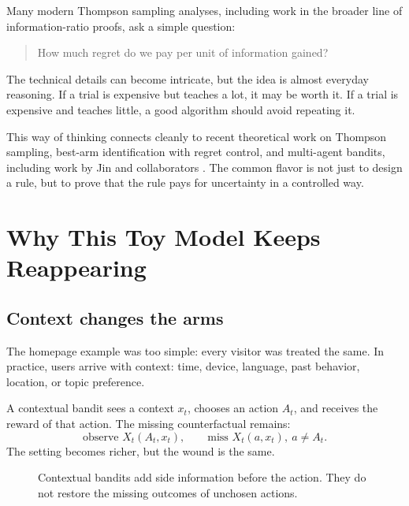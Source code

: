 \documentclass[en,nofont,11pt]{elegantbook}
\begin{document}
Many modern Thompson sampling analyses, including work in the broader line of information-ratio proofs, ask a simple question:

\begin{quote}
How much regret do we pay per unit of information gained?
\end{quote}

The technical details can become intricate, but the idea is almost everyday reasoning. If a trial is expensive but teaches a lot, it may be worth it. If a trial is expensive and teaches little, a good algorithm should avoid repeating it.

This way of thinking connects cleanly to recent theoretical work on Thompson sampling, best-arm identification with regret control, and multi-agent bandits, including work by Jin and collaborators \cite{jin2022expts,yang2024minimal,jin2024mamab}. The common flavor is not just to design a rule, but to prove that the rule pays for uncertainty in a controlled way.

\chapter{Why This Toy Model Keeps Reappearing}

\section{Context changes the arms}

The homepage example was too simple: every visitor was treated the same. In practice, users arrive with context: time, device, language, past behavior, location, or topic preference.

A contextual bandit sees a context $x_t$, chooses an action $A_t$, and receives the reward of that action. The missing counterfactual remains:
\[
\text{observe }X_t(A_t,x_t),
\qquad
\text{miss }X_t(a,x_t),\ a\neq A_t.
\]
The setting becomes richer, but the wound is the same.

\begin{figure}[h]
\centering
{}
\caption{Contextual bandits add side information before the action. They do not restore the missing outcomes of unchosen actions.}
\end{figure}
\end{document}
